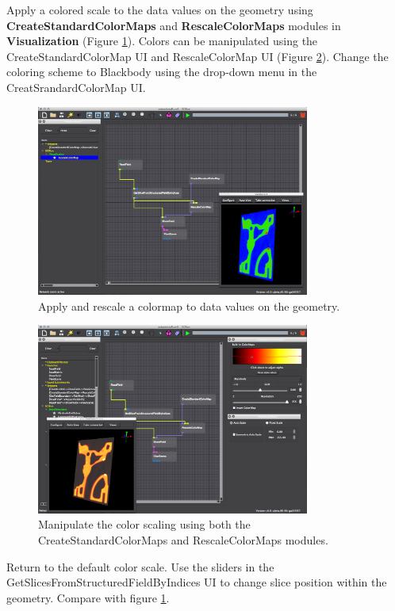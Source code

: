 \documentclass[fleqn,11pt,openany]{book}
\begin{document}
Apply a colored scale to the data values on the geometry using \textbf{CreateStandardColorMaps}
and \textbf{RescaleColorMaps} modules in \textbf{Visualization} (Figure \ref{fig:rescale}). Colors can be manipulated using the CreateStandardColorMap UI and RescaleColorMap UI (Figure \ref{fig:viewscene}). Change the coloring scheme to Blackbody using the drop-down menu in the CreatSrandardColorMap UI.  

\begin{figure}[H]
\center
\includegraphics[width=0.8\textwidth]{BasicTutorial_figures/colorscale.png}
\caption{Apply and rescale a colormap to data values on the geometry.}
\label{fig:rescale}
\end{figure}

\begin{figure}[H]
\center
\includegraphics[width=0.8\textwidth]{BasicTutorial_figures/manipulatecolorscale.png}
\caption{Manipulate the color scaling using both the CreateStandardColorMaps and RescaleColorMaps modules.}
\label{fig:viewscene}
\end{figure}

Return to the default color scale. Use the sliders in the GetSlicesFromStructuredFieldByIndices UI
to change slice position within the geometry. Compare with figure \ref{fig:rescale}. 
\end{document}
